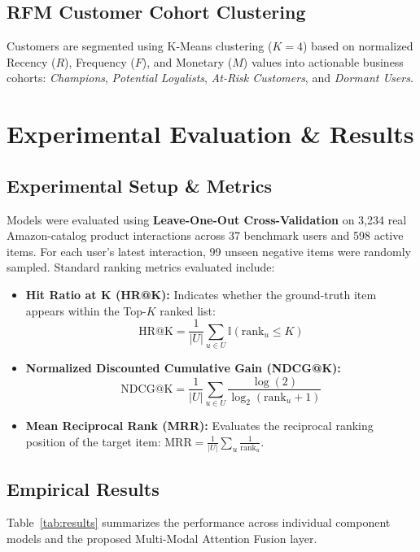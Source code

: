 \documentclass[conference]{IEEEtran}
\begin{document}
\subsection{RFM Customer Cohort Clustering}
Customers are segmented using K-Means clustering ($K=4$) based on normalized Recency ($R$), Frequency ($F$), and Monetary ($M$) values into actionable business cohorts: \textit{Champions}, \textit{Potential Loyalists}, \textit{At-Risk Customers}, and \textit{Dormant Users}.

\section{Experimental Evaluation \& Results}

\subsection{Experimental Setup \& Metrics}
Models were evaluated using \textbf{Leave-One-Out Cross-Validation} on 3,234 real Amazon-catalog product interactions across 37 benchmark users and 598 active items. For each user's latest interaction, 99 unseen negative items were randomly sampled. Standard ranking metrics evaluated include:
\begin{itemize}
    \item \textbf{Hit Ratio at K (HR@K):} Indicates whether the ground-truth item appears within the Top-$K$ ranked list:
    \begin{equation}
    \text{HR@K} = \frac{1}{|U|} \sum_{u \in U} \mathbb{I}(\text{rank}_u \le K)
    \end{equation}
    \item \textbf{Normalized Discounted Cumulative Gain (NDCG@K):}
    \begin{equation}
    \text{NDCG@K} = \frac{1}{|U|} \sum_{u \in U} \frac{\log(2)}{\log_2(\text{rank}_u + 1)}
    \end{equation}
    \item \textbf{Mean Reciprocal Rank (MRR):} Evaluates the reciprocal ranking position of the target item: $\text{MRR} = \frac{1}{|U|} \sum_{u} \frac{1}{\text{rank}_u}$.
\end{itemize}

\subsection{Empirical Results}
Table~\ref{tab:results} summarizes the performance across individual component models and the proposed Multi-Modal Attention Fusion layer.
\end{document}
